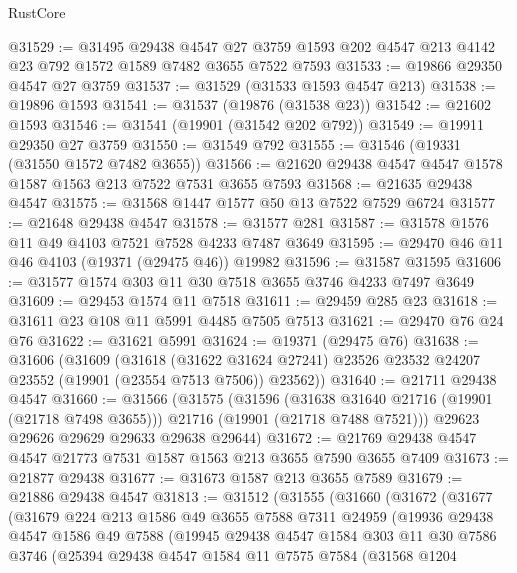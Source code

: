 \begin{lexlean}{RustCore}
\begin{coremodule}
@31529 := @31495
    @29438
    @4547
    @27
    @3759
    @1593
    @202
    @4547
    @213
    @4142
    @23
    @792
    @1572
    @1589
    @7482
    @3655
    @7522
    @7593
@31533 := @19866 @29350 @4547 @27 @3759
@31537 := @31529 (@31533 @1593 @4547 @213)
@31538 := @19896 @1593
@31541 := @31537 (@19876 (@31538 @23))
@31542 := @21602 @1593
@31546 := @31541 (@19901 (@31542 @202 @792))
@31549 := @19911 @29350 @27 @3759
@31550 := @31549 @792
@31555 := @31546 (@19331 (@31550 @1572 @7482 @3655))
@31566 := @21620 @29438 @4547 @4547 @1578 @1587 @1563 @213 @7522 @7531 @3655 @7593
@31568 := @21635 @29438 @4547
@31575 := @31568 @1447 @1577 @50 @13 @7522 @7529 @6724
@31577 := @21648 @29438 @4547
@31578 := @31577 @281
@31587 := @31578 @1576 @11 @49 @4103 @7521 @7528 @4233 @7487 @3649
@31595 := @29470 @46 @11 @46 @4103 (@19371 (@29475 @46)) @19982
@31596 := @31587 @31595
@31606 := @31577 @1574 @303 @11 @30 @7518 @3655 @3746 @4233 @7497 @3649
@31609 := @29453 @1574 @11 @7518
@31611 := @29459 @285 @23
@31618 := @31611 @23 @108 @11 @5991 @4485 @7505 @7513
@31621 := @29470 @76 @24 @76
@31622 := @31621 @5991
@31624 := @19371 (@29475 @76)
@31638 := @31606
    (@31609
      (@31618
        (@31622 @31624 @27241)
        @23526
        @23532
        @24207
        @23552
        (@19901 (@23554 @7513 @7506))
        @23562))
@31640 := @21711 @29438 @4547
@31660 := @31566
    (@31575
      (@31596
        (@31638 @31640 @21716 (@19901 (@21718 @7498 @3655)))
        @21716
        (@19901 (@21718 @7488 @7521)))
      @29623
      @29626
      @29629
      @29633
      @29638
      @29644)
@31672 := @21769 @29438 @4547 @4547 @21773 @7531 @1587 @1563 @213 @3655 @7590 @3655 @7409
@31673 := @21877 @29438
@31677 := @31673 @1587 @213 @3655 @7589
@31679 := @21886 @29438 @4547
@31813 := @31512
    (@31555
      (@31660
        (@31672
          (@31677
            (@31679
              @224
              @213
              @1586
              @49
              @3655
              @7588
              @7311
              @24959
              (@19936
                @29438
                @4547
                @1586
                @49
                @7588
                (@19945
                  @29438
                  @4547
                  @1584
                  @303
                  @11
                  @30
                  @7586
                  @3746
                  (@25394
                    @29438
                    @4547
                    @1584
                    @11
                    @7575
                    @7584
                    (@31568
                      @1204

\end{coremodule}
\end{lexlean}
